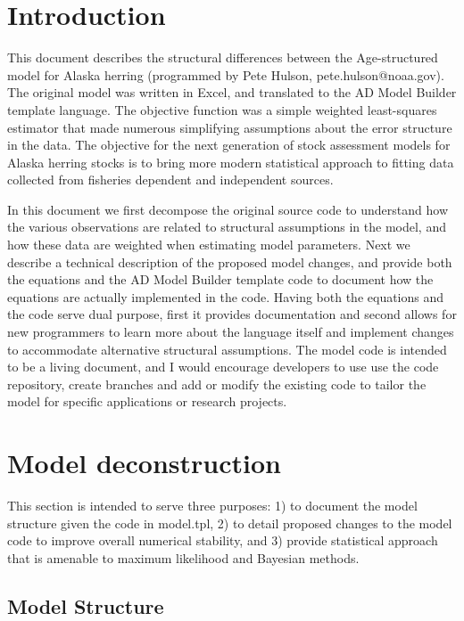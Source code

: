 \documentclass[12pt,letterpaper]{article}
\begin{document}
  \tableofcontents

  \section{Introduction} %
  \label{sec:introduction}

  This document describes the structural differences between the Age-structured model for Alaska herring (programmed by Pete Hulson, pete.hulson@noaa.gov). The original model was written in Excel, and translated to the AD Model Builder template language.  The objective function was a simple weighted least-squares estimator that made numerous simplifying assumptions about the error structure in the data.  The objective for the next generation of stock assessment models for Alaska herring stocks is to bring more modern statistical approach to fitting data collected from fisheries dependent and independent sources.  

  In this document we first decompose the original source code to understand how the various observations are related to structural assumptions in the model, and how these data are weighted when estimating model parameters.  Next we describe a technical description of the proposed model changes, and provide both the equations and the AD Model Builder template code to document how the equations are actually implemented in the code.  Having both the equations and the code serve dual purpose, first it provides  documentation and second allows for new programmers to learn more about the language itself and implement changes to accommodate alternative structural assumptions. The model code is intended to be a living document, and I would encourage developers to use use the code repository, create branches and add or modify the existing code to tailor the model for specific  applications or research projects.
  

  \section{Model deconstruction} %
  \label{sec:model_deconstruction}
  This section is intended to serve three purposes: 1) to document the model structure given the code in model.tpl,  2) to detail proposed changes to the model code to improve overall numerical stability, and 3) provide statistical approach that is amenable to maximum likelihood and Bayesian methods.

    \subsection{Model Structure} %
    \label{sub:model_structure}
    
\end{document}
